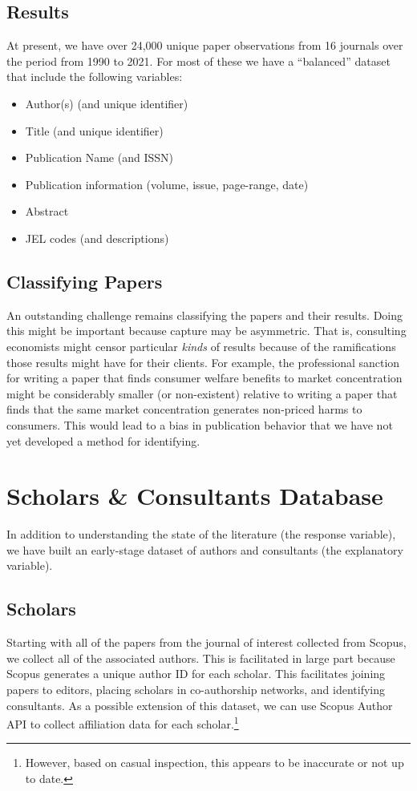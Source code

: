 \documentclass[11pt, letterpaper, twoside]{article}
\begin{document}
\subsection{Results}
At present, we have over 24,000 unique paper observations from 16 journals over the period from 1990 to 2021. For most of these we have a ``balanced'' dataset that include the following variables:
\begin{multicols}{2}
    \begin{itemize}
        \item Author(s) (and unique identifier)
        \item Title (and unique identifier)
        \item Publication Name (and ISSN)
        \item Publication information (volume, issue, page-range, date)
        \item Abstract
        \item JEL codes (and descriptions)
    \end{itemize}
\end{multicols}

\subsection{Classifying Papers}
An outstanding challenge remains classifying the papers and their results. Doing this might be important because capture may be asymmetric. That is, consulting economists might censor particular \textit{kinds} of results because of the ramifications those results might have for their clients. For example, the professional sanction for writing a paper that finds consumer welfare benefits to market concentration might be considerably smaller (or non-existent) relative to writing a paper that finds that the same market concentration generates non-priced harms to consumers. This would lead to a bias in publication behavior that we have not yet developed a method for identifying.

\section{Scholars \& Consultants Database}
In addition to understanding the state of the literature (the response variable), we have built an early-stage dataset of authors and consultants (the explanatory variable). 

\subsection{Scholars}
Starting with all of the papers from the journal of interest collected from Scopus, we collect all of the associated authors. This is facilitated in large part because Scopus generates a unique author ID for each scholar. This facilitates joining papers to editors, placing scholars in co-authorship networks, and identifying consultants. As a possible extension of this dataset, we can use Scopus Author API to collect affiliation data for each scholar.\footnote{However, based on casual inspection, this appears to be inaccurate or not up to date.}
\end{document}
